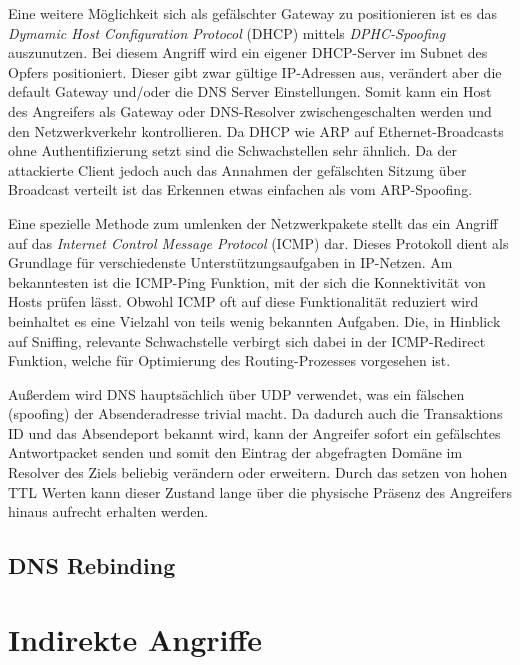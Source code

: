 Eine weitere Möglichkeit sich als gefälschter Gateway zu positionieren ist es das \textit{Dymamic Host Configuration Protocol} (DHCP) mittels \textit{DPHC-Spoofing} auszunutzen. Bei diesem Angriff wird ein eigener DHCP-Server im Subnet des Opfers positioniert. Dieser gibt zwar gültige IP-Adressen aus, verändert aber die default Gateway und/oder die DNS Server Einstellungen. Somit kann ein Host des Angreifers als Gateway oder DNS-Resolver zwischengeschalten werden und den Netzwerkverkehr kontrollieren. Da DHCP wie ARP auf Ethernet-Broadcasts ohne Authentifizierung setzt sind die Schwachstellen sehr ähnlich. Da der attackierte Client jedoch auch das Annahmen der gefälschten Sitzung über Broadcast verteilt ist das Erkennen etwas einfachen als vom ARP-Spoofing. 

Eine spezielle Methode zum umlenken der Netzwerkpakete stellt das ein Angriff auf das \textit{Internet Control Message Protocol} (ICMP) dar. Dieses Protokoll dient als Grundlage für verschiedenste Unterstützungsaufgaben in IP-Netzen. Am bekanntesten ist die ICMP-Ping Funktion, mit der sich die Konnektivität von Hosts prüfen lässt. Obwohl ICMP oft auf diese Funktionalität reduziert wird beinhaltet es eine Vielzahl von teils wenig bekannten Aufgaben. Die, in Hinblick auf Sniffing, relevante Schwachstelle verbirgt sich dabei in der ICMP-Redirect Funktion, welche für Optimierung des Routing-Prozesses vorgesehen ist. 

Außerdem wird DNS hauptsächlich über UDP verwendet, was ein fälschen (spoofing) der Absenderadresse trivial macht. Da dadurch auch die Transaktions ID und das Absendeport bekannt wird, kann der Angreifer sofort ein gefälschtes Antwortpacket senden und somit den Eintrag der abgefragten Domäne im Resolver des Ziels beliebig verändern oder erweitern. Durch das setzen von hohen TTL Werten kann dieser Zustand lange über die physische Präsenz des Angreifers hinaus aufrecht erhalten werden.


\subsection{DNS Rebinding}


\section{Indirekte Angriffe}

